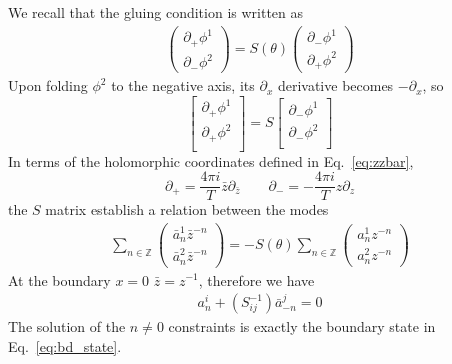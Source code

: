 We recall that the gluing condition is written as
\begin{equation}
\begin{aligned}
\label{eq:def_S_in_app}
\begin{pmatrix}
\partial_+\phi^1\\
\partial_-\phi^2
\end{pmatrix}
=S(\theta)
\begin{pmatrix}
\partial_-\phi^1\\
\partial_+\phi^2
\end{pmatrix}
\end{aligned}
\end{equation}
Upon folding $\phi^2$ to the negative axis, its $\partial_x$ derivative becomes $-\partial_x$, so 
\begin{equation}
\begin{bmatrix}
\partial_{+} \phi^1 \\
\partial_{+} \phi^2 \\
\end{bmatrix}
 = S
\begin{bmatrix}
\partial_{-} \phi^1 \\
\partial_{-} \phi^2 \\
\end{bmatrix}
\end{equation}
In terms of the holomorphic coordinates defined in Eq.~\eqref{eq:zzbar}, 
\begin{equation}
\partial_{+} = \frac{4\pi i }{T} \bar{z} \partial_{\bar{z}} \qquad \partial_{-} = -\frac{4\pi i }{T} z\partial_{z}
\end{equation}
the $S$ matrix establish a relation between the modes
\begin{equation}
\begin{aligned}
\label{eq:def_S_in_app_2}
\sum_{n\in\mathbb{Z}}
\begin{pmatrix}
\bar{a}_n^1\bar{z}^{-n}\\
\bar{a}_n^2\bar{z}^{-n}
\end{pmatrix}
= -S(\theta)
\sum_{n\in\mathbb{Z}}
\begin{pmatrix}
a_n^1{z}^{-n}\\
a_n^2{z}^{-n}
\end{pmatrix}
\end{aligned}
\end{equation}
At the boundary $x = 0$ $\bar{z}=z^{-1}$, therefore we have
\begin{equation}
\begin{aligned}
a^i_n + (S^{-1}_{ij})\bar{a}^j_{-n}=0
\end{aligned}
\end{equation}
The solution of the $n \ne 0$ constraints is exactly the boundary state in Eq.~\eqref{eq:bd_state}. 

